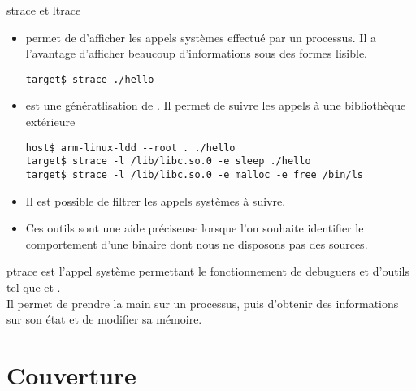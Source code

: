 \begin{frame}[fragile=singleslide]{strace et ltrace}
  \begin{itemize}
  \item {} permet de d'afficher les appels systèmes effectué
    par   un   processus.   Il   a  l'avantage   d'afficher   beaucoup
    d'informations sous des formes lisible.
    \begin{lstlisting} 
target$ strace ./hello
    \end{lstlisting}  
  \item  {}  est  une  génératlisation de  .  Il
    permet de suivre les appels à une bibliothèque extérieure
    \begin{lstlisting} 
host$ arm-linux-ldd --root . ./hello
target$ strace -l /lib/libc.so.0 -e sleep ./hello
target$ strace -l /lib/libc.so.0 -e malloc -e free /bin/ls
    \end{lstlisting}  
  \item Il est possible de filtrer les appels systèmes à suivre.
  \item  Ces outils  sont une  aide préciseuse  lorsque  l'on souhaite
    identifier le  comportement d'une  binaire dont nous  ne disposons
    pas des sources.
  \end{itemize} 
\end{frame}

\begin{frame}[fragile=singleslide]{ptrace}
    est l'appel  système permettant  le  fonctionnement de
  debuguers et d'outils tel que  et .
  \\[2ex]
  Il permet  de prendre la main  sur un processus,  puis d'obtenir des
  informations sur son état et de modifier sa mémoire.
\end{frame}

\section{Couverture}

